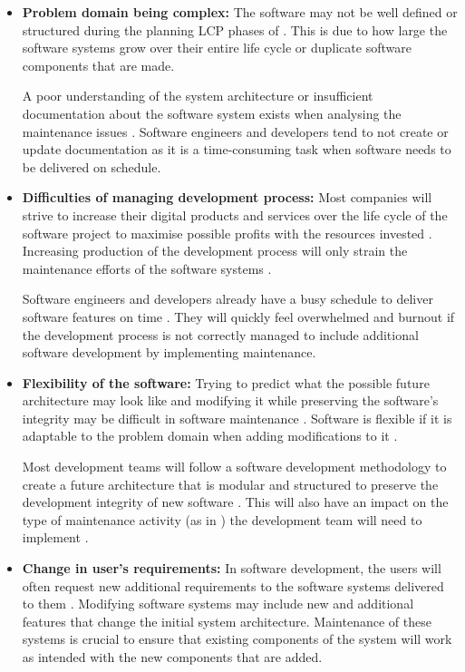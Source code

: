\begin{itemize}
	\item \textbf{Problem domain being complex:} The software may not be well defined or structured during the planning LCP phases of . This is due to how large the software systems grow over their entire life cycle or duplicate software components that are made.\par A poor understanding of the system architecture or insufficient documentation about the software system exists when analysing the maintenance issues \cite{Galster2019, Booch1986}. Software engineers and developers tend to not create or update documentation as it is a time-consuming task when software needs to be delivered on schedule.
	\item \textbf{Difficulties of managing development process:} Most companies will strive to increase their digital products and services over the life cycle of the software project to maximise possible profits with the resources invested \cite{Niu2018}. Increasing production of the development process will only strain the maintenance efforts of the software systems \cite{Sneed2004}.\par Software engineers and developers already have a busy schedule to deliver software features on time \cite{Galster2019, Ogheneovo2014, Lenarduzzi2017}. They will quickly feel overwhelmed and burnout if the development process is not correctly managed to include additional software development by implementing maintenance.
	\item \textbf{Flexibility of the software:} Trying to predict what the possible future architecture may look like and modifying it while preserving the software's integrity may be difficult in software maintenance \cite{Garlan1999}. Software is flexible if it is adaptable to the problem domain when adding modifications to it \cite{Ogheneovo2014}.\par Most development teams will follow a software development methodology to create a future architecture that is modular and structured to preserve the development integrity of new software \cite{Vijayasarathy2016, Rehman2018}. This will also have an impact on the type of maintenance activity (as in ) the development team will need to implement \cite{Thamburaj2017, Hasan2012, Stojanov2017, Snipes2018}.
	\item \textbf{Change in user's requirements:} In software development, the users will often request new additional requirements to the software systems delivered to them \cite{Ogheneovo2014}. Modifying software systems may include new and additional features that change the initial system architecture. Maintenance of these systems is crucial to ensure that existing components of the system will work as intended with the new components that are added.

\end{itemize}
